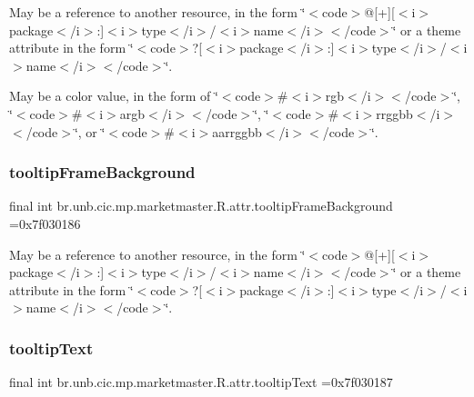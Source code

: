 May be a reference to another resource, in the form \char`\"{}$<$code$>$@\mbox{[}+\mbox{]}\mbox{[}$<$i$>$package$<$/i$>$\+:\mbox{]}$<$i$>$type$<$/i$>$/$<$i$>$name$<$/i$>$$<$/code$>$\char`\"{} or a theme attribute in the form \char`\"{}$<$code$>$?\mbox{[}$<$i$>$package$<$/i$>$\+:\mbox{]}$<$i$>$type$<$/i$>$/$<$i$>$name$<$/i$>$$<$/code$>$\char`\"{}. 

May be a color value, in the form of \char`\"{}$<$code$>$\#$<$i$>$rgb$<$/i$>$$<$/code$>$\char`\"{}, \char`\"{}$<$code$>$\#$<$i$>$argb$<$/i$>$$<$/code$>$\char`\"{}, \char`\"{}$<$code$>$\#$<$i$>$rrggbb$<$/i$>$$<$/code$>$\char`\"{}, or \char`\"{}$<$code$>$\#$<$i$>$aarrggbb$<$/i$>$$<$/code$>$\char`\"{}. \mbox{\label{classbr_1_1unb_1_1cic_1_1mp_1_1marketmaster_1_1R_1_1attr_ae3aed9911de8e3c47c1885e8db3a3f1c}} 
\subsubsection{\texorpdfstring{tooltip\+Frame\+Background}{tooltipFrameBackground}}
{\footnotesize\ttfamily final int br.\+unb.\+cic.\+mp.\+marketmaster.\+R.\+attr.\+tooltip\+Frame\+Background =0x7f030186\hspace{0.3cm}{\ttfamily [static]}}

May be a reference to another resource, in the form \char`\"{}$<$code$>$@\mbox{[}+\mbox{]}\mbox{[}$<$i$>$package$<$/i$>$\+:\mbox{]}$<$i$>$type$<$/i$>$/$<$i$>$name$<$/i$>$$<$/code$>$\char`\"{} or a theme attribute in the form \char`\"{}$<$code$>$?\mbox{[}$<$i$>$package$<$/i$>$\+:\mbox{]}$<$i$>$type$<$/i$>$/$<$i$>$name$<$/i$>$$<$/code$>$\char`\"{}. \mbox{\label{classbr_1_1unb_1_1cic_1_1mp_1_1marketmaster_1_1R_1_1attr_a531b0326ef17c24a0771927cf2b5b775}} 
\subsubsection{\texorpdfstring{tooltip\+Text}{tooltipText}}
{\footnotesize\ttfamily final int br.\+unb.\+cic.\+mp.\+marketmaster.\+R.\+attr.\+tooltip\+Text =0x7f030187\hspace{0.3cm}{\ttfamily [static]}}

